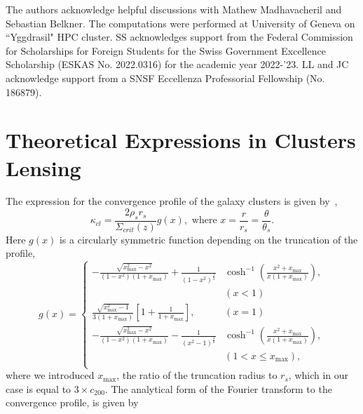 \documentclass[prd, superscriptaddress, tightenlines, longbibliography, nofootinbib, eqsecnum, amsfonts, amsmath, floatfix, twocolumn, notitlepage]{revtex4-2}
\begin{document}
\hspace*{0.05cm}
\begin{acknowledgements}
The authors acknowledge helpful discussions with Mathew Madhavacheril and Sebastian Belkner. The computations were performed at University of Geneva on ``Yggdrasil" HPC cluster. SS acknowledges support from the Federal Commission for Scholarships for Foreign Students for the Swiss Government Excellence Scholarship (ESKAS No. 2022.0316) for the academic year 2022-'23. LL and JC acknowledge support from a SNSF Eccellenza Professorial Fellowship (No. 186879).

\end{acknowledgements}

\appendix
\section{Theoretical Expressions in Clusters Lensing}\label{A2}
The expression for the convergence profile of the galaxy clusters is given by~\cite{Takada:2002qq},
\begin{equation}
    \kappa_{cl} = \frac{2\rho_s r_s}{\Sigma_{crit}(z)}g(x), \text{ where } x=\frac{r}{r_s} = \frac{\theta}{\theta_s}.
\end{equation}
Here $g(x)$ is a circularly symmetric function depending on the truncation of the profile,
\begin{equation}
    g(x) = 
     \begin{cases}
       -\frac{\sqrt{x_{\text{max}}^2-x^2}}{(1-x^2)(1+x_{\text{max}})} + \frac{1}{(1-x^2)^{\frac{3}{2}}}&\cosh^{-1}\left(\frac{x^2+x_{\text{max}}}{x(1+x_{\text{max}})}\right),  \\ &(x < 1)\\
       \frac{\sqrt{x_{\text{max}}^2 - 1}}{3(1+x_{\text{max}})}\left[ 1+\frac{1}{1+x_{\text{max}}} \right],  &(x = 1)\\
       -\frac{\sqrt{x_{\text{max}}^2-x^2}}{(1-x^2)(1+x_{\text{max}})} - \frac{1}{(x^2-1)^{\frac{3}{2}}}&\cosh^{-1}\left(\frac{x^2+x_{\text{max}}}{x(1+x_{\text{max}})}\right),  \\
       &(1< x \leq x_{\text{max}}),\\
     \end{cases}
\end{equation}
where we introduced $x_{\text{max}}$, the ratio of the truncation radius to $r_s$, which in our case is equal to $3\times c_{200}$. 
The analytical form of the Fourier transform to the convergence profile, is given by \cite{Scoccimarro:2000gm, 2011PhRvD..83b3008O, Takada:2002qq}
\end{document}
